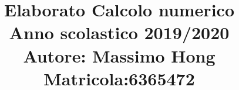 \documentclass[a4paper]{article}
\begin{document}
\title{Elaborato Calcolo numerico\\Anno scolastico 2019/2020\\  Autore: Massimo Hong\\Matricola:6365472}
\maketitle
\newpage
\tableofcontents
\cleardoublepage


























\end{document}
